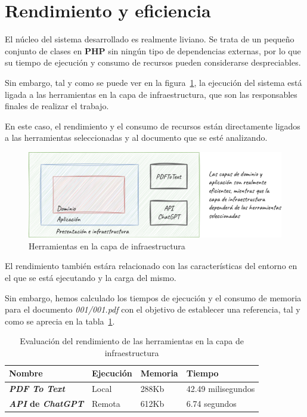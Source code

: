 \section{Rendimiento y eficiencia}

El núcleo del sistema desarrollado es realmente liviano.
Se trata de un pequeño conjunto de clases en \textbf{PHP} sin ningún tipo de dependencias externas, por lo que su
tiempo de ejecución y consumo de recursos pueden considerarse despreciables.

Sin embargo, tal y como se puede ver en la figura~\ref{fig:chapter_5.2.performance}, la ejecución del sistema está
ligada a las herramientas en la capa de infraestructura, que son las responsables finales de realizar el trabajo.

En este caso, el rendimiento y el consumo de recursos están directamente ligados a las herramientas seleccionadas y al
documento que se esté analizando.

\begin{figure}[ht]
    \begin{center}
        \includegraphics[width=\textwidth]{./chapter/5/images/chapter_5.2.performance}
        \caption{Herramientas en la capa de infraestructura}
        \label{fig:chapter_5.2.performance}
    \end{center}
\end{figure}

El rendimiento también estára relacionado con las características del entorno en el que se está ejecutando y la
carga del mismo.

Sin embargo, hemos calculado los tiempos de ejecución y el consumo de memoria para el documento \textit{001/001.pdf}
con el objetivo de establecer una referencia, tal y como se aprecia en la tabla~\ref{tab:execution_performance}.

\begin{table}[h]
    \renewcommand{\arraystretch}{1.5}
    \setlength{\tabcolsep}{10pt}
    \begin{tabular}{>{\bfseries}p{} p{} p{} p{}}
        \toprule
        \textbf{Nombre}                  & \textbf{Ejecución} & \textbf{Memoria} & \textbf{Tiempo}    \\
        \midrule
        \textit{PDF To Text}             & Local              & 288Kb            & 42.49 milisegundos \\
        \textit{API} de \textit{ChatGPT} & Remota             & 612Kb            & 6.74 segundos      \\
        \bottomrule
    \end{tabular}
    \caption{Evaluación del rendimiento de las herramientas en la capa de infraestructura}
    \label{tab:execution_performance}
\end{table}

